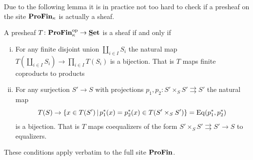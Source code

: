 Due to the following lemma it is in practice not too hard to check if a presheaf on the site ${\mathbf{ProFin}}_{\kappa}$ is actually a sheaf.
\begin{lemma}
	\label{lemma: simplified sheaf conditions for profinite sets}
	
	A presheaf $T\colon {\mathbf{ProFin}}_{\kappa}^{\mathrm{op}} \to {{\mathbf{\underline{S}et}}}$ is a sheaf if and only if
	\begin{enumerate}[(i)]
		\item
		\label{lemma: simplified sheaf conditions for profinite sets, i}
		For any finite disjoint union $\coprod_{i\in I} S_i$ the natural map $T(\coprod_{i\in I} S_i)\to \prod_{i\in I} T(S_i)$ is a bijection. That is $T$ maps finite coproducts to products
		
		\item
		\label{lemma: simplified sheaf conditions for profinite sets, ii}
		For any surjection $S'\to S$ with projections $p_1, p_2\colon S'\times_S S'\rightrightarrows S'$ the natural map
			$$T(S) \to \{x\in T(S')\,\vert\, p_1^\ast(x)=p_2^\ast(x) \in T(S'\times_S S')\}=\operatorname{Eq}(p_1^\ast, p_2^\ast)$$
		is a bijection. That is $T$ maps coequalizers of the form $S'\times_S S'\rightrightarrows S'\to S$ to equalizers.
	\end{enumerate}
	
	These conditions apply verbatim to the full site ${\mathbf{ProFin}}$.
\end{lemma}

